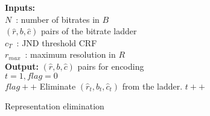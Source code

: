 \documentclass{article}
\begin{document}
\begin{algorithm}[t]
\textbf{Inputs:}\\
\quad $N$~: number of bitrates in $B$\\
\quad $(\hat{r},b, \hat{c})$ pairs of the bitrate ladder \\
\quad $c_T$~: JND threshold CRF \\
\quad $r_{max}$~: maximum resolution in $R$ \\
\textbf{Output:} $(\hat{r},b,\hat{c})$ pairs for encoding \\
$t=1, flag=0$\\
{
{$flag++$}
{Eliminate $(\hat{r}_{t},b_{t}, \hat{c}_{t})$ from the ladder.}
$t++$
}
\caption{Representation elimination}
\label{algo:res_eliminate}
\end{algorithm}
\setlength{\textfloatsep}{4pt}
\end{document}
